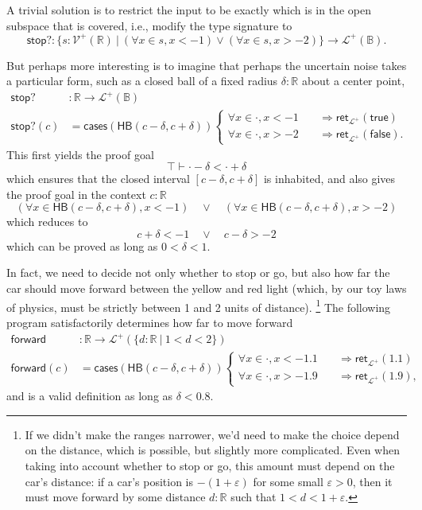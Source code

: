 \documentclass{article}           %
\newcommand{\R}{\mathbb{R}}
\newcommand{\suchthat}{\ |\ }
\newcommand{\bool}{\mathbb{B}}
\newcommand{\PLower}{\mathcal{L}^+}
\newcommand{\Viet}{{\mathcal{V}^+}}
\newcommand{\ret}[1]{\mathsf{ret}_{#1}}
\newcommand{\HeineBorel}{\mathsf{HB}}
\begin{document}
A trivial solution is to restrict the input to be exactly which is in the open subspace that is covered, i.e., modify the type signature to
\[
\mathsf{stop?} : \{ s : \Viet(\R) \suchthat 
 \left(\forall x \in s, x < -1 \right) \vee \left(\forall x \in s, x > -2 \right)
 \} \to \PLower(\bool).
\]

But perhaps more interesting is to imagine that perhaps the uncertain noise takes a particular form, such as a closed ball of a fixed radius $\delta : \R$ about a center point,
\begin{align*}
\mathsf{stop?} &: \R \to \PLower(\bool)
\\ \mathsf{stop?}(c) &= \mathsf{cases}(\HeineBorel(c - \delta, c + \delta))
\begin{cases}
\forall x \in \cdot, x < -1
  \quad &\Longrightarrow
   \ret{\PLower} (\mathsf{true})
\\
\forall x \in \cdot, x > -2
  \quad &\Longrightarrow
   \ret{\PLower}(\mathsf{false}).
\end{cases}
\end{align*}
This first yields the proof goal
\[
\top \vdash \cdot - \delta < \cdot + \delta
\]
which ensures that the closed interval $[c - \delta, c + \delta]$ is inhabited, and also gives the proof goal in the context $c : \R$
\[
\left( \forall x \in \HeineBorel(c - \delta, c + \delta), x < -1 \right)
\quad \vee \quad
\left( \forall x \in \HeineBorel(c - \delta, c + \delta), x > -2 \right)
\]
which reduces to
\[
c + \delta < -1  \quad \vee \quad
c - \delta > - 2
\]
which can be proved as long as $0 < \delta < 1$.

In fact, we need to decide not only whether to stop or go, but also how far the car should move forward between the yellow and red light (which, by our toy laws of physics, must be strictly between 1 and 2 units of distance). 
\footnote{If we didn't make the ranges narrower, we'd need to make the choice depend on the distance, which is possible, but slightly more complicated. Even when taking into account whether to stop or go, this amount must depend on the car's distance: if a car's position is $-(1 + \varepsilon)$ for some small $\varepsilon > 0$, then it must move forward by some distance $d : \R$ such that $1 < d < 1 + \varepsilon$.} 
The following program satisfactorily determines how far to move forward
\begin{align*}
\mathsf{forward} &: \R \to \PLower(\{ d : \R \suchthat 1 < d < 2 \})
\\ \mathsf{forward}(c) &= \mathsf{cases}(\HeineBorel(c - \delta, c + \delta))
\begin{cases}
\forall x \in \cdot, x < -1.1
  \quad &\Longrightarrow
   \ret{\PLower}(1.1)
\\
\forall x \in \cdot, x > -1.9
  \quad &\Longrightarrow
   \ret{\PLower}(1.9),
\end{cases}
\end{align*}
and is a valid definition as long as $\delta < 0.8$.
\end{document}
